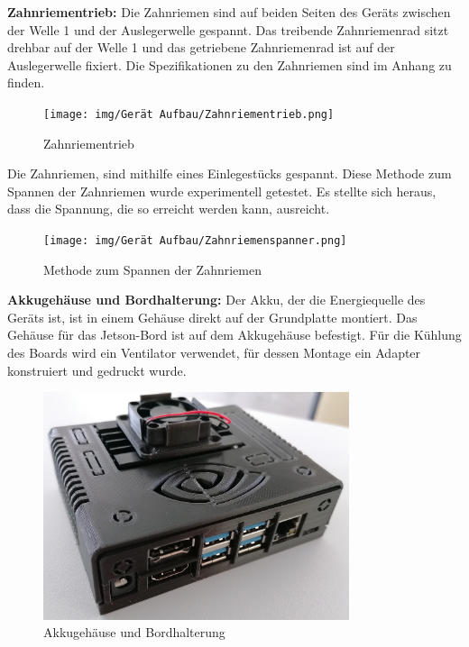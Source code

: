 \newpage

\textbf{Zahnriementrieb:} Die Zahnriemen sind auf beiden Seiten des Geräts zwischen der Welle 1 und der Auslegerwelle gespannt. Das treibende Zahnriemenrad sitzt drehbar auf der Welle 1 und das getriebene Zahnriemenrad ist auf der Auslegerwelle fixiert. Die Spezifikationen zu den Zahnriemen sind im Anhang  %
zu finden.

\begin{figure}[H]
  \texttt{[image: img/Gerät Aufbau/Zahnriementrieb.png]}
  \centering
  \caption{Zahnriementrieb}
  \label{fig:Zahnriementrieb}
\end{figure}

Die Zahnriemen, sind mithilfe eines Einlegestücks gespannt. Diese Methode zum Spannen der Zahnriemen wurde experimentell getestet. Es stellte sich heraus, dass die Spannung, die so erreicht werden kann, ausreicht.

\begin{figure}[H]
  \texttt{[image: img/Gerät Aufbau/Zahnriemenspanner.png]}
  \centering
  \caption{Methode zum Spannen der Zahnriemen}
  \label{fig:Methode zum Spannen}
\end{figure}

\newpage




\textbf{Akkugehäuse und Bordhalterung:} Der Akku, der die Energiequelle des Geräts ist, ist in einem Gehäuse direkt auf der Grundplatte montiert. Das Gehäuse für das Jetson-Bord ist auf dem Akkugehäuse befestigt. Für die Kühlung des Boards wird ein Ventilator verwendet, für dessen Montage ein Adapter konstruiert und gedruckt wurde.

\begin{figure}[H]
  \includegraphics[width=0.8\textwidth]{img/Gerät Aufbau/Gehäuse_Jetson_2.jpeg.jpg}
  \centering
  \caption{Akkugehäuse und Bordhalterung}
  \label{fig:Akkugehäuse und Bordhalterung}
\end{figure}

